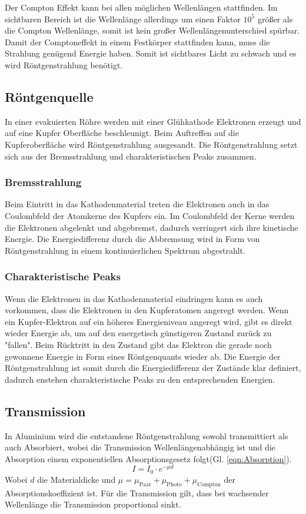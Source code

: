 Der Compton Effekt kann bei allen möglichen Wellenlängen stattfinden.
Im sichtbaren Bereich ist die Wellenlänge allerdings um einen Faktor $10^5$ größer als die Compton Wellenlänge, somit ist kein großer Wellenlängenunterschied spürbar.
Damit der Comptoneffekt in einem Festkörper stattfinden kann, muss die Strahlung genügend Energie haben. Somit ist sichtbares Licht zu schwach und es wird Röntgenstrahlung benötigt.


\subsection{Röntgenquelle}
In einer evakuierten Röhre werden mit einer Glühkathode Elektronen erzeugt und auf eine Kupfer Oberfläche beschleunigt.
Beim Auftreffen auf die Kupferoberfläche wird Röntgenstrahlung ausgesandt. Die Röntgenstrahlung setzt sich aus der Bremsstrahlung und charakteristischen Peaks zusammen.

\subsubsection{Bremsstrahlung}
Beim Eintritt in das Kathodenmaterial treten die Elektronen auch in das Coulombfeld der Atomkerne des Kupfers ein.
Im Coulombfeld der Kerne werden die Elektronen abgelenkt und abgebremst, dadurch verringert sich ihre kinetische Energie.
Die Energiedifferenz durch die Abbremsung wird in Form von Röntgenstrahlung in einem kontinuierlichen Spektrum abgestrahlt.

\subsubsection{Charakteristische Peaks}
Wenn die Elektronen in das Kathodenmaterial eindringen kann es auch vorkommen, dass die Elektronen in den Kupferatomen angeregt werden.
Wenn ein Kupfer-Elektron auf ein höheres Energieniveau angeregt wird, gibt es direkt wieder Energie ab, um auf den energetisch günstigeren Zustand zurück zu "fallen".
Beim Rücktritt in den Zustand gibt das Elektron die gerade noch gewonnene Energie in Form eines Röntgenquants wieder ab.
Die Energie der Röntgenstrahlung ist somit durch die Energiedifferenz der Zustände klar definiert, dadurch enstehen charakteristische Peaks zu den entsprechenden Energien.

\subsection{Transmission}
In Aluminium wird die entstandene Röntgenstrahlung sowohl transmittiert als auch Absorbiert, wobei die Transmission Wellenlängenabhängig ist und die Absorption einem exponentiellen Absorptionsgesetz folgt(Gl. \ref{eqn:Absorption}).
\begin{equation}
    I = I_0 \cdot e^{-\mu d} \label{eqn:Absorption}
\end{equation}
Wobei $d$ die Materialdicke und $\mu = \mu_{\text{Paar}}+\mu_{\text{Photo}}+\mu_{\text{Compton}}$ der Absorptionskoeffizient ist.
Für die Transmission gilt, dass bei wachsender Wellenlänge die Transmission proportional sinkt.

